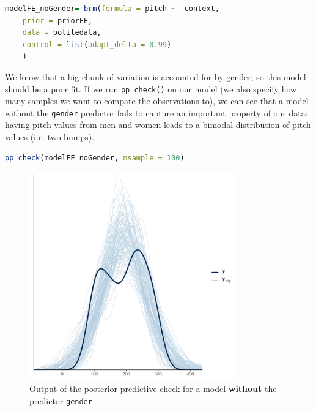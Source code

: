 \documentclass[nobib]{tufte-handout}
\begin{document}
\bigskip

\begin{minipage}[]{1\textwidth}
\begin{lstlisting}[language=R]
modelFE_noGender= brm(formula = pitch ~  context,
	prior = priorFE,
	data = politedata,
	control = list(adapt_delta = 0.99)
	)
\end{lstlisting}
\end{minipage}

We know that a big chunk of variation is accounted for by gender, so this model should be a poor fit. If we run \texttt{pp\_check()} on our model (we also specify how many samples we want to compare the observations to), we can see that a model without the \texttt{gender} predictor fails to capture an important property of our data: having pitch values from men and women leads to a bimodal distribution of pitch values (i.e. two bumps).

\bigskip

\begin{minipage}[]{1\textwidth}
\begin{lstlisting}[language=R]
pp_check(modelFE_noGender, nsample = 100)
\end{lstlisting}
\end{minipage}

\begin{figure}[]
  \centering
    \includegraphics[width = 0.8\textwidth]{pics/pp_check_FE_noGender.pdf}
    \caption{Output of the posterior predictive check for a model \textbf{without} the predictor \texttt{gender}}
    \label{fig:coefficients_table}
\end{figure}
\end{document}
